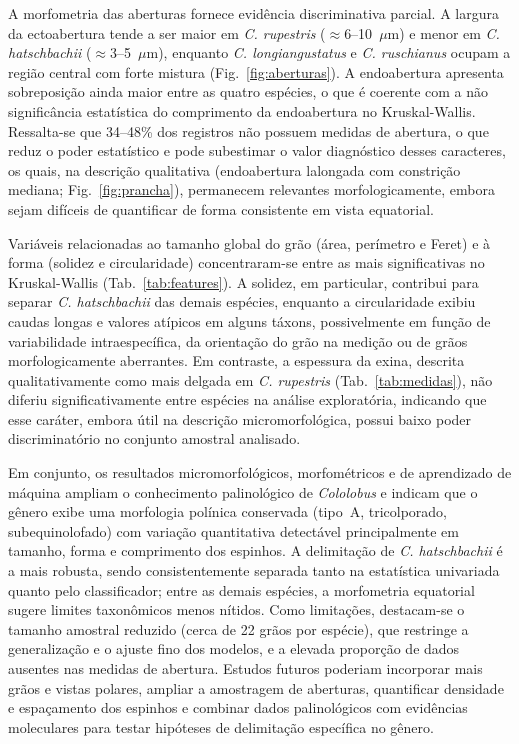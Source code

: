 \documentclass[pdflatex,sn-mathphys-num]{sn-jnl}
\begin{document}
A morfometria das aberturas fornece evidência discriminativa parcial. A largura da ectoabertura tende a ser maior em \textit{C. rupestris} ($\approx$6--10~$\mu$m) e menor em \textit{C. hatschbachii} ($\approx$3--5~$\mu$m), enquanto \textit{C. longiangustatus} e \textit{C. ruschianus} ocupam a região central com forte mistura (Fig.~\ref{fig:aberturas}). A endoabertura apresenta sobreposição ainda maior entre as quatro espécies, o que é coerente com a não significância estatística do comprimento da endoabertura no Kruskal-Wallis. Ressalta-se que 34--48\% dos registros não possuem medidas de abertura, o que reduz o poder estatístico e pode subestimar o valor diagnóstico desses caracteres, os quais, na descrição qualitativa (endoabertura lalongada com constrição mediana; Fig.~\ref{fig:prancha}), permanecem relevantes morfologicamente, embora sejam difíceis de quantificar de forma consistente em vista equatorial.

Variáveis relacionadas ao tamanho global do grão (área, perímetro e Feret) e à forma (solidez e circularidade) concentraram-se entre as mais significativas no Kruskal-Wallis (Tab.~\ref{tab:features}). A solidez, em particular, contribui para separar \textit{C. hatschbachii} das demais espécies, enquanto a circularidade exibiu caudas longas e valores atípicos em alguns táxons, possivelmente em função de variabilidade intraespecífica, da orientação do grão na medição ou de grãos morfologicamente aberrantes. Em contraste, a espessura da exina, descrita qualitativamente como mais delgada em \textit{C. rupestris} (Tab.~\ref{tab:medidas}), não diferiu significativamente entre espécies na análise exploratória, indicando que esse caráter, embora útil na descrição micromorfológica, possui baixo poder discriminatório no conjunto amostral analisado.

Em conjunto, os resultados micromorfológicos, morfométricos e de aprendizado de máquina ampliam o conhecimento palinológico de \textit{Cololobus} e indicam que o gênero exibe uma morfologia polínica conservada (tipo~A, tricolporado, subequinolofado) com variação quantitativa detectável principalmente em tamanho, forma e comprimento dos espinhos. A delimitação de \textit{C. hatschbachii} é a mais robusta, sendo consistentemente separada tanto na estatística univariada quanto pelo classificador; entre as demais espécies, a morfometria equatorial sugere limites taxonômicos menos nítidos. Como limitações, destacam-se o tamanho amostral reduzido (cerca de 22 grãos por espécie), que restringe a generalização e o ajuste fino dos modelos, e a elevada proporção de dados ausentes nas medidas de abertura. Estudos futuros poderiam incorporar mais grãos e vistas polares, ampliar a amostragem de aberturas, quantificar densidade e espaçamento dos espinhos e combinar dados palinológicos com evidências moleculares para testar hipóteses de delimitação específica no gênero.

\backmatter





\end{document}
